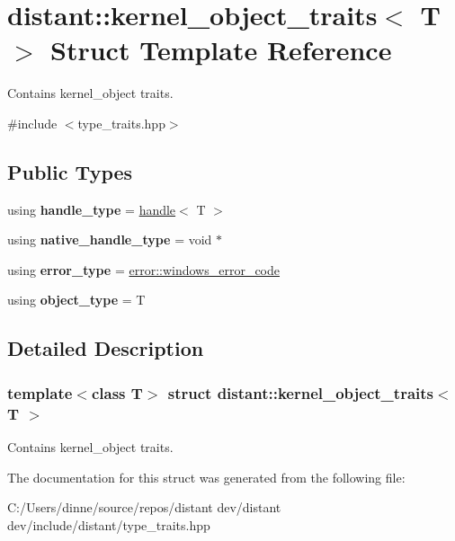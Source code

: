 \hypertarget{structdistant_1_1kernel__object__traits}{}\section{distant\+:\+:kernel\+\_\+object\+\_\+traits$<$ T $>$ Struct Template Reference}
\label{structdistant_1_1kernel__object__traits}


Contains kernel\+\_\+object traits.  




{\ttfamily \#include $<$type\+\_\+traits.\+hpp$>$}

\subsection*{Public Types}
\begin{DoxyCompactItemize}
\item 
\mbox{\label{structdistant_1_1kernel__object__traits_a937d5543766e1377cba1a5cfa2033efc}} 
using {\bfseries handle\+\_\+type} = \mbox{\hyperlink{classdistant_1_1handle}{handle}}$<$ T $>$
\item 
\mbox{\label{structdistant_1_1kernel__object__traits_a9effba9262500c321af99969236b72a6}} 
using {\bfseries native\+\_\+handle\+\_\+type} = void $\ast$
\item 
\mbox{\label{structdistant_1_1kernel__object__traits_a5dba6e5dfc0831aea1e024edd4cfb7d3}} 
using {\bfseries error\+\_\+type} = \mbox{\hyperlink{classdistant_1_1error_1_1windows__error__code}{error\+::windows\+\_\+error\+\_\+code}}
\item 
\mbox{\label{structdistant_1_1kernel__object__traits_a7e9548e129037c9dfcd73c816019360e}} 
using {\bfseries object\+\_\+type} = T
\end{DoxyCompactItemize}


\subsection{Detailed Description}
\subsubsection*{template$<$class T$>$\newline
struct distant\+::kernel\+\_\+object\+\_\+traits$<$ T $>$}

Contains kernel\+\_\+object traits. 

The documentation for this struct was generated from the following file\+:\begin{DoxyCompactItemize}
\item 
C\+:/\+Users/dinne/source/repos/distant dev/distant dev/include/distant/type\+\_\+traits.\+hpp\end{DoxyCompactItemize}
